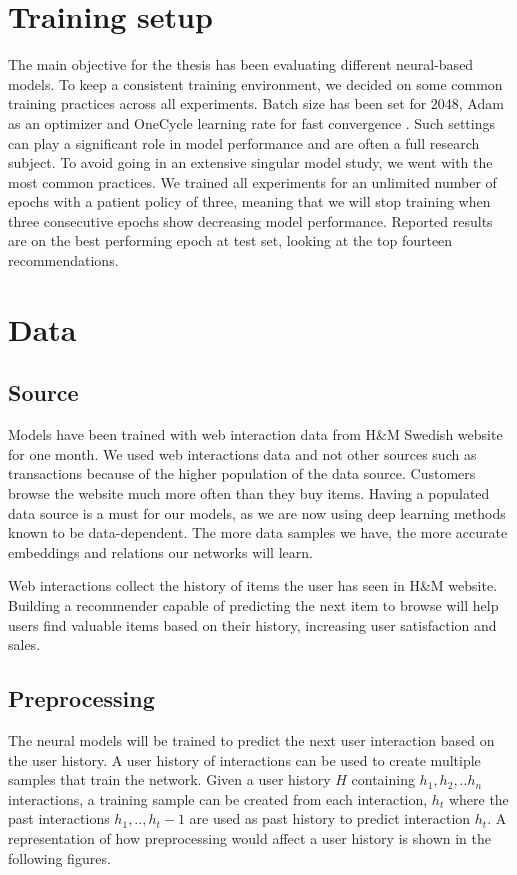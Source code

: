 \documentclass{kththesis}
\begin{document}
\section{Training setup}
The main objective for the thesis has been evaluating different neural-based models. To keep a consistent training environment, we decided on some common training practices across all experiments. Batch size has been set for 2048, Adam\cite{adam} as an optimizer and OneCycle learning rate for fast convergence \cite{onecycle}. Such settings can play a significant role in model performance and are often a full research subject. To avoid going in an extensive singular model study, we went with the most common practices. We trained all experiments for an unlimited number of epochs with a patient policy of three, meaning that we will stop training when three consecutive epochs show decreasing model performance. Reported results are on the best performing epoch at test set, looking at the top fourteen recommendations.

\section{Data}
\subsection{Source}
Models have been trained with web interaction data from H\&M Swedish website for one month. We used web interactions data and not other sources such as transactions because of the higher population of the data source. Customers browse the website much more often than they buy items. Having a populated data source is a must for our models, as we are now using deep learning methods known to be data-dependent. The more data samples we have, the more accurate embeddings and relations our networks will learn. 

Web interactions collect the history of items the user has seen in H\&M website. Building a recommender capable of predicting the next item to browse will help users find valuable items based on their history, increasing user satisfaction and sales.

\subsection{Preprocessing}
The neural models will be trained to predict the next user interaction based on the user history. A user history of interactions can be used to create multiple samples that train the network. Given a user history $H$ containing $h_1, h_2, .. h_n$ interactions, a training sample can be created from each interaction, $h_t$ where the past interactions $h_1, .., h_t-1$ are used as past history to predict interaction $h_t$. A representation of how preprocessing would affect a user history is shown in the following figures.
\end{document}
